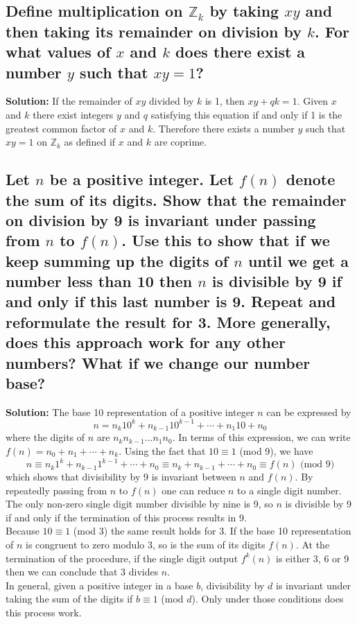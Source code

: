 \documentclass{article}
\newcommand{\exercise}[1]{\subsection{\normalfont #1}}
\newcommand{\solution}{\indent\indent \textbf{Solution: }}
\begin{document}
\exercise{Define multiplication on $\mathbb{Z}_k$ by taking $xy$ and then taking its remainder on division by $k$. For what values of $x$ and $k$ does there exist a number $y$ such that $xy = 1$?}
\solution 
If the remainder of $xy$ divided by $k$ is 1, then $xy +qk = 1$. Given $x$ and $k$ there exist integers $y$ and $q$ satisfying this equation if and only if 1 is the greatest common factor of $x$ and $k$. Therefore there exists a number $y$ such that $xy=1$ on $\mathbb{Z}_k$ as defined if $x$ and $k$ are coprime. 
\exercise{Let $n$ be a positive integer. Let $f(n)$ denote the sum of its digits. Show that the remainder on division by 9 is invariant under passing from $n$ to $f(n)$. Use this to show that if we keep summing up the digits of $n$ until we get a number less than 10 then $n$ is divisible by 9 if and only if this last number is 9. Repeat and reformulate the result for 3. More generally, does this approach work for any other numbers? What if we change our number base?}
\solution
The base 10 representation of a positive integer $n$ can be expressed by $$n = n_k10^k + n_{k-1}10^{k-1} + \dotsb + n_1 10 + n_0$$ where the digits of $n$ are $n_k n_{k-1}\dots n_1 n_0$. In terms of this expression, we can write $f(n)= n_0 + n_1 + \dotsb + n_k$. Using the fact that $10 \equiv 1$ (mod 9), we have $$n \equiv n_k1^k + n_{k-1}1^{k-1} + \dotsb + n_0 \equiv n_k + n_{k-1} + \dotsb + n_0 \equiv f(n) \text{ (mod 9)}$$ 
which shows that divisibility by 9 is invariant between $n$ and $f(n)$. By repeatedly passing from $n$ to $f(n)$ one can reduce $n$ to a single digit number. The only non-zero single digit number divisible by nine is 9, so $n$ is divisible by 9 if and only if the termination of this process results in 9. \\
\indent Because $10 \equiv 1$ (mod 3) the same result holds for 3. If the base 10 representation of $n$ is congruent to zero modulo 3, so is the sum of its digits $f(n)$. At the termination of the procedure, if the single digit output $f^k(n)$ is either 3, 6 or 9 then we can conclude that 3 divides $n$. \\
\indent In general, given a positive integer in a base $b$, divisibility by $d$ is invariant under taking the sum of the digits if $b \equiv 1$ (mod $d$). Only under those conditions does this process work.

\newpage
\end{document}
